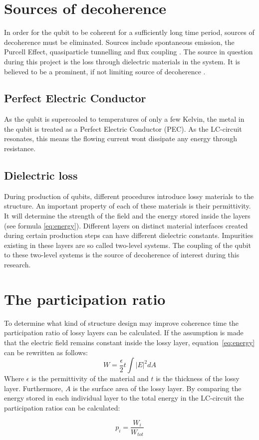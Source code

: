 \section{Sources of decoherence}
In order for the qubit to be coherent for a sufficiently long time period, sources of decoherence must be eliminated. Sources include spontaneous emission, the Purcell Effect, quasiparticle tunnelling and flux coupling \cite{Koch2007}.   
The source in question during this project is the loss through dielectric materials in the system. It is believed to be a prominent, if not limiting source of decoherence \cite{Koch2007}\cite{PhysRevLett.95.210503}. 
 
\subsection{Perfect Electric Conductor}
As the qubit is supercooled to temperatures of only a few Kelvin, the metal in the qubit is treated as a Perfect Electric Conductor (PEC). As the LC-circuit resonates, this means the flowing current wont dissipate any energy through resistance. 
 
\subsection{Dielectric loss}
During production of qubits, different procedures introduce lossy materials to the structure. An important property of each of these materials is their permittivity. It will determine the strength of the field and the energy stored inside the layers (see formula \eqref{eq:energy}). Different layers on distinct material interfaces created during certain production steps can have different dielectric constants.   
Impurities existing in these layers are so called two-level systems. The coupling of the qubit to these two-level systems is the source of decoherence of interest during this research. 

\section{The participation ratio}
To determine what kind of structure design may improve coherence time the participation ratio of lossy layers can be calculated. If the assumption is made that the electric field remains constant inside the lossy layer, equation~\eqref{eq:energy} can be rewritten as follows:
\begin{equation}\label{eq:energy_layer}
W = \frac{\epsilon}{2}t\int{|E|}^{2}dA
\end{equation}
Where \(\epsilon\) is the permittivity of the material and \(t\) is the thickness of the lossy layer. Furthermore, \(A\) is the surface area of the lossy layer. By comparing the energy stored in each individual layer to the total energy in the LC-circuit the participation ratios can be calculated:

\begin{equation}\label{eq:PartRatio}
p_{\textit{i}}=\frac{W_{\textit{i}}}{W_{tot}}
\end{equation}


